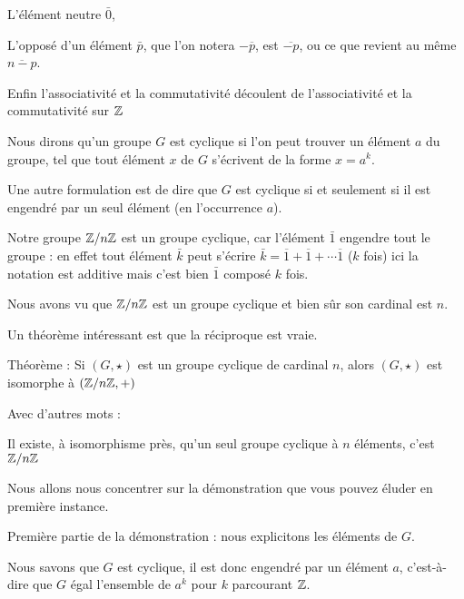 L'élément neutre $\bar 0$,

\change

L'opposé d'un élément $\bar p$, que l'on notera $-\overline p$, est $\overline{-p}$,
ou ce que revient au même $\overline{n-p}$.

\change

Enfin l'associativité et la commutativité découlent
de l'associativité et la commutativité sur $\mathbb{Z}$

\diapo

Nous dirons  qu'un groupe $G$ est cyclique
si l'on peut trouver un élément $a$ du groupe, tel que tout élément 
 $x$ de $G$ s'écrivent de la forme $x=a^k$.

\change

Une autre formulation est de dire que $G$ est cyclique si et seulement si
il est engendré par un seul élément (en l'occurrence $a$).

\change

Notre groupe $\mathbb{Z}/n\mathbb{Z}$ est un groupe cyclique, car l'élément $\bar 1$ engendre 
tout le groupe :
en effet tout élément $\bar k$ peut s'écrire 
$\bar k = \overline 1 + \overline 1 + \cdots \overline 1$ ($k$ fois)
ici la notation est additive mais c'est bien $\bar 1$ composé $k$ fois.


\diapo

Nous avons vu que $\mathbb{Z}/n\mathbb{Z}$ est un groupe cyclique et bien sûr son cardinal
est $n$. 

Un théorème intéressant est que la réciproque est vraie.

Théorème : Si $(G,\star)$ est un groupe cyclique de cardinal $n$, alors  
$(G,\star)$ est isomorphe à $(\mathbb{Z}/n\mathbb{Z},+)$

\change

Avec d'autres mots :

Il existe, à isomorphisme près, qu'un seul groupe 
cyclique à $n$ éléments, c'est $\mathbb{Z}/n\mathbb{Z}$


Nous allons nous concentrer sur la démonstration que vous pouvez éluder
en première instance.


\diapo

Première partie de la démonstration : nous explicitons les éléments de $G$.

Nous savons que $G$ est cyclique, il est donc engendré par un élément $a$,
c'est-à-dire que $G$ égal l'ensemble de $a^k$ pour $k$ parcourant $\mathbb{Z}$.

